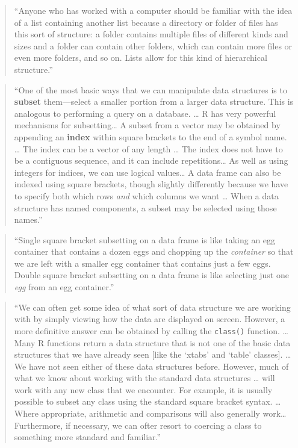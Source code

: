 \documentclass[]{tufte-book}
\begin{document}
\begin{quote}
``Anyone who has worked with a computer should be familiar with the idea of
a list containing another list because a directory or folder of files has this sort
of structure: a folder contains multiple files of different kinds and sizes and
a folder can contain other folders, which can contain more files or even more
folders, and so on. Lists allow for this kind of hierarchical structure.''
\citep{murrell2009introduction}
\end{quote}

\begin{quote}
``One of the most basic ways that we can manipulate data structures is to
\textbf{subset} them---select a smaller portion from a larger data structure. This
is analogous to performing a query on a database. \ldots{} R has very powerful
mechanisms for subsetting\ldots{} A subset from a vector may be obtained by
appending an \textbf{index} within square brackets to the end of a symbol name. \ldots{}
The index can be a vector of any length \ldots{} The index does not have to be
a contiguous sequence, and it can include repetitions\ldots{} As well as using
integers for indices, we can use logical values\ldots{} A data frame can also
be indexed using square brackets, though slightly differently because we have
to specify both which rows \emph{and} which columns we want \ldots{} When a data structure
has named components, a subset may be selected using those names.''
\citep{murrell2009introduction}
\end{quote}

\begin{quote}
``Single square bracket subsetting on a data frame is like taking an egg container
that contains a dozen eggs and chopping up the \emph{container} so that we are left
with a smaller egg container that contains just a few eggs. Double square bracket
subsetting on a data frame is like selecting just one \emph{egg} from an egg container.''
\citep{murrell2009introduction}
\end{quote}

\begin{quote}
``We can often get some idea of what sort of data structure we are working with
by simply viewing how the data are displayed on screen. However, a more definitive
answer can be obtained by calling the \texttt{class()} function. \ldots{} Many R functions
return a data structure that is not one of the basic data structures that we have
already seen {[}like the `xtabs' and `table' classes{]}. \ldots{} We have not seen either
of these data structures before. However, much of what we know about working with
the standard data structures \ldots{} will work with any new class that we encounter.
For example, it is usually possible to subset any class using the standard
square bracket syntax. \ldots{} Where appropriate, arithmetic and comparisons will
also generally work\ldots{} Furthermore, if necessary, we can ofter resort to coercing
a class to something more standard and familiar.'' \citep{murrell2009introduction}
\end{quote}
\end{document}
